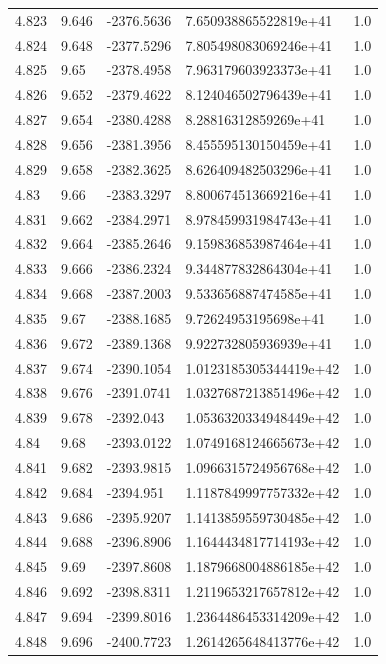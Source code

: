 \begin{tabular}{lllll}
4.823 & 9.646 & -2376.5636 & 7.650938865522819e+41 & 1.0 \\
4.824 & 9.648 & -2377.5296 & 7.805498083069246e+41 & 1.0 \\
4.825 & 9.65 & -2378.4958 & 7.963179603923373e+41 & 1.0 \\
4.826 & 9.652 & -2379.4622 & 8.124046502796439e+41 & 1.0 \\
4.827 & 9.654 & -2380.4288 & 8.28816312859269e+41 & 1.0 \\
4.828 & 9.656 & -2381.3956 & 8.455595130150459e+41 & 1.0 \\
4.829 & 9.658 & -2382.3625 & 8.626409482503296e+41 & 1.0 \\
4.83 & 9.66 & -2383.3297 & 8.800674513669216e+41 & 1.0 \\
4.831 & 9.662 & -2384.2971 & 8.978459931984743e+41 & 1.0 \\
4.832 & 9.664 & -2385.2646 & 9.159836853987464e+41 & 1.0 \\
4.833 & 9.666 & -2386.2324 & 9.344877832864304e+41 & 1.0 \\
4.834 & 9.668 & -2387.2003 & 9.533656887474585e+41 & 1.0 \\
4.835 & 9.67 & -2388.1685 & 9.72624953195698e+41 & 1.0 \\
4.836 & 9.672 & -2389.1368 & 9.922732805936939e+41 & 1.0 \\
4.837 & 9.674 & -2390.1054 & 1.0123185305344419e+42 & 1.0 \\
4.838 & 9.676 & -2391.0741 & 1.0327687213851496e+42 & 1.0 \\
4.839 & 9.678 & -2392.043 & 1.0536320334948449e+42 & 1.0 \\
4.84 & 9.68 & -2393.0122 & 1.0749168124665673e+42 & 1.0 \\
4.841 & 9.682 & -2393.9815 & 1.0966315724956768e+42 & 1.0 \\
4.842 & 9.684 & -2394.951 & 1.1187849997757332e+42 & 1.0 \\
4.843 & 9.686 & -2395.9207 & 1.1413859559730485e+42 & 1.0 \\
4.844 & 9.688 & -2396.8906 & 1.1644434817714193e+42 & 1.0 \\
4.845 & 9.69 & -2397.8608 & 1.1879668004886185e+42 & 1.0 \\
4.846 & 9.692 & -2398.8311 & 1.2119653217657812e+42 & 1.0 \\
4.847 & 9.694 & -2399.8016 & 1.2364486453314209e+42 & 1.0 \\
4.848 & 9.696 & -2400.7723 & 1.2614265648413776e+42 & 1.0 \\

\end{tabular}
